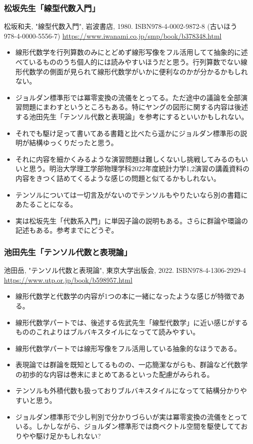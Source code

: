 \documentclass[10pt,a4paper]{jsarticle}
\begin{document}
\subsubsection*{松坂先生「線型代数入門」}
松坂和夫, "線型代数入門", 岩波書店, 1980. ISBN978-4-0002-9872-8 (古いほう 978-4-0000-5556-7) \url{https://www.iwanami.co.jp/smp/book/b378348.html}
\begin{itemize}
    \item 線形代数学を行列算数のみにとどめず線形写像をフル活用してて抽象的に述べているもののうち個人的には読みやすいほうだと思う。行列算数でない線形代数学の側面が見られて線形代数学がいかに便利なのかが分かるかもしれない。
    \item ジョルダン標準形では冪零変換の流儀をとってる。ただ途中の議論を全部演習問題にまわすというところもある。特にヤングの図形に関する内容は後述する池田先生「テンソル代数と表現論」を参考にするといいかもしれない。
    \item それでも駆け足って書いてある書籍と比べたら遥かにジョルダン標準形の説明が結構ゆっくりだったと思う。
    \item それに内容を細かくみるような演習問題は難しくないし挑戦してみるのもいいと思う。明治大学理工学部物理学科2022年度統計力学1,2演習の講義資料の内容をきつく詰めてくるような感じの問題と似てるかもしれない。
    \item テンソルについては一切言及がないのでテンソルもやりたいなら別の書籍にあたることになる。
    \item 実は松坂先生「代数系入門」に単因子論の説明もある。さらに群論や環論の記述もある。参考までにどうぞ。
\end{itemize}
\subsubsection*{池田先生「テンソル代数と表現論」}
池田岳, "テンソル代数と表現論", 東京大学出版会, 2022. ISBN978-4-1306-2929-4 \url{https://www.utp.or.jp/book/b598957.html}
\begin{itemize}
    \item 線形代数学と代数学の内容が1つの本に一緒になったような感じが特徴である。
    \item 線形代数学パートでは、後述する佐武先生「線型代数学」に近い感じがするもののこれよりはブルバキスタイルになってて読みやすい。
    \item 線形代数学パートでは線形写像をフル活用している抽象的なほうである。
    \item 表現論では群論を既知としてるものの、一応簡潔ながらも、群論など代数学の初歩的な内容は巻末にまとめてあるといった配慮がみられる。
    \item テンソルも外積代数も扱っておりブルバキスタイルになってて結構分かりやすいと思う。
    \item ジョルダン標準形で少し判別で分かりづらいが実は冪零変換の流儀をとっている。しかしながら、ジョルダン標準形では商ベクトル空間を駆使してておりやや駆け足かもしれない? 
\end{itemize}
\end{document}

